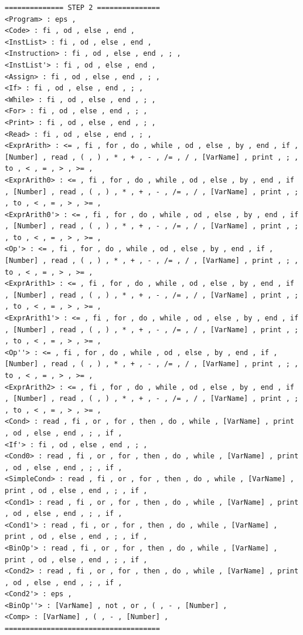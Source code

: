 \documentclass[pdftex,10pt,a4paper]{article}
\begin{document}
\begin{lstlisting}[breaklines]
============== STEP 2 ===============
<Program> : eps , 
<Code> : fi , od , else , end , 
<InstList> : fi , od , else , end , 
<Instruction> : fi , od , else , end , ; , 
<InstList'> : fi , od , else , end , 
<Assign> : fi , od , else , end , ; , 
<If> : fi , od , else , end , ; , 
<While> : fi , od , else , end , ; , 
<For> : fi , od , else , end , ; , 
<Print> : fi , od , else , end , ; , 
<Read> : fi , od , else , end , ; , 
<ExprArith> : <= , fi , for , do , while , od , else , by , end , if , [Number] , read , ( , ) , * , + , - , /= , / , [VarName] , print , ; , to , < , = , > , >= , 
<ExprArith0> : <= , fi , for , do , while , od , else , by , end , if , [Number] , read , ( , ) , * , + , - , /= , / , [VarName] , print , ; , to , < , = , > , >= , 
<ExprArith0'> : <= , fi , for , do , while , od , else , by , end , if , [Number] , read , ( , ) , * , + , - , /= , / , [VarName] , print , ; , to , < , = , > , >= , 
<Op'> : <= , fi , for , do , while , od , else , by , end , if , [Number] , read , ( , ) , * , + , - , /= , / , [VarName] , print , ; , to , < , = , > , >= , 
<ExprArith1> : <= , fi , for , do , while , od , else , by , end , if , [Number] , read , ( , ) , * , + , - , /= , / , [VarName] , print , ; , to , < , = , > , >= , 
<ExprArith1'> : <= , fi , for , do , while , od , else , by , end , if , [Number] , read , ( , ) , * , + , - , /= , / , [VarName] , print , ; , to , < , = , > , >= , 
<Op''> : <= , fi , for , do , while , od , else , by , end , if , [Number] , read , ( , ) , * , + , - , /= , / , [VarName] , print , ; , to , < , = , > , >= , 
<ExprArith2> : <= , fi , for , do , while , od , else , by , end , if , [Number] , read , ( , ) , * , + , - , /= , / , [VarName] , print , ; , to , < , = , > , >= , 
<Cond> : read , fi , or , for , then , do , while , [VarName] , print , od , else , end , ; , if , 
<If'> : fi , od , else , end , ; , 
<Cond0> : read , fi , or , for , then , do , while , [VarName] , print , od , else , end , ; , if , 
<SimpleCond> : read , fi , or , for , then , do , while , [VarName] , print , od , else , end , ; , if , 
<Cond1> : read , fi , or , for , then , do , while , [VarName] , print , od , else , end , ; , if , 
<Cond1'> : read , fi , or , for , then , do , while , [VarName] , print , od , else , end , ; , if , 
<BinOp'> : read , fi , or , for , then , do , while , [VarName] , print , od , else , end , ; , if , 
<Cond2> : read , fi , or , for , then , do , while , [VarName] , print , od , else , end , ; , if , 
<Cond2'> : eps , 
<BinOp''> : [VarName] , not , or , ( , - , [Number] , 
<Comp> : [VarName] , ( , - , [Number] , 
=====================================
\end{lstlisting}
\end{document}
